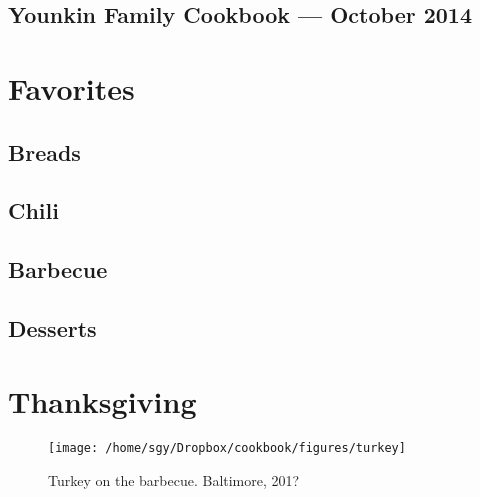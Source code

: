 \documentclass[12pt, final]{book}
\begin{document}
\frontmatter

\cleardoublepage
\section*{Younkin Family Cookbook --- October 2014}

\tableofcontents
\mainmatter

\chapter{Favorites}\label{chapter1}

\newpage

\newpage

\newpage

\newpage

\newpage

\newpage
\section{Breads}

\newpage

\newpage

\newpage
\section{Chili}

\newpage

\newpage

\newpage
\section{Barbecue}

\newpage

\newpage
\section{Desserts}

\newpage

\newpage

\newpage

\clearpage
\chapter{Thanksgiving}\label{chapter2}
\begin{figure}[h]
\begin{center}
\texttt{[image: /home/sgy/Dropbox/cookbook/figures/turkey]}
\end{center}
\caption*{Turkey on the barbecue. Baltimore, 201?}
\end{figure}
\newpage


\newpage

\newpage

\newpage

\newpage

\newpage

\newpage

\newpage
\end{document}
